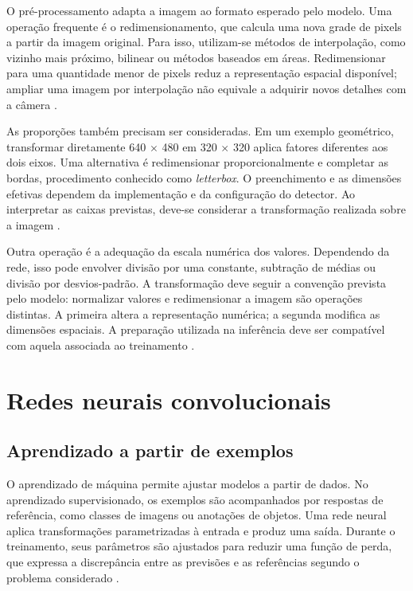 O pré-processamento adapta a imagem ao formato esperado pelo modelo. Uma operação frequente é o redimensionamento, que calcula uma nova grade de pixels a partir da imagem original. Para isso, utilizam-se métodos de interpolação, como vizinho mais próximo, bilinear ou métodos baseados em áreas. Redimensionar para uma quantidade menor de pixels reduz a representação espacial disponível; ampliar uma imagem por interpolação não equivale a adquirir novos detalhes com a câmera \cite{opencv-transform}.

As proporções também precisam ser consideradas. Em um exemplo geométrico, transformar diretamente 640 \(\times\) 480 em 320 \(\times\) 320 aplica fatores diferentes aos dois eixos. Uma alternativa é redimensionar proporcionalmente e completar as bordas, procedimento conhecido como \textit{letterbox}. O preenchimento e as dimensões efetivas dependem da implementação e da configuração do detector. Ao interpretar as caixas previstas, deve-se considerar a transformação realizada sobre a imagem \cite{ultralytics-predict}.

Outra operação é a adequação da escala numérica dos valores. Dependendo da rede, isso pode envolver divisão por uma constante, subtração de médias ou divisão por desvios-padrão. A transformação deve seguir a convenção prevista pelo modelo: normalizar valores e redimensionar a imagem são operações distintas. A primeira altera a representação numérica; a segunda modifica as dimensões espaciais. A preparação utilizada na inferência deve ser compatível com aquela associada ao treinamento \cite{stanford-preprocess}.

\section{Redes neurais convolucionais}
\label{sec:redes-convolucionais}

\subsection{Aprendizado a partir de exemplos}
\label{subsec:aprendizado-supervisionado}

O aprendizado de máquina permite ajustar modelos a partir de dados. No aprendizado supervisionado, os exemplos são acompanhados por respostas de referência, como classes de imagens ou anotações de objetos. Uma rede neural aplica transformações parametrizadas à entrada e produz uma saída. Durante o treinamento, seus parâmetros são ajustados para reduzir uma função de perda, que expressa a discrepância entre as previsões e as referências segundo o problema considerado \cite{lecun-2015}.

